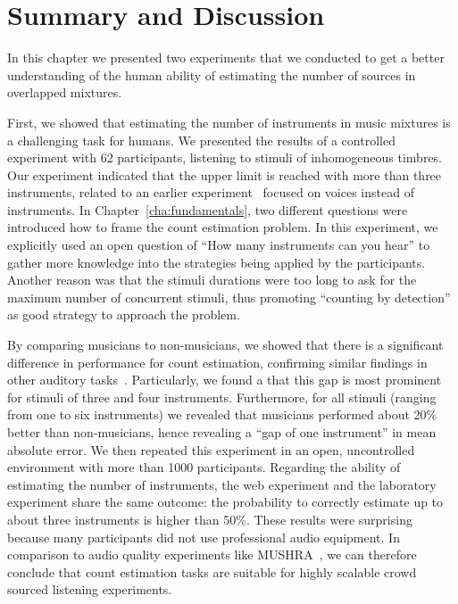 \section{Summary and Discussion}


In this chapter we presented two experiments that we conducted to get a better understanding of the human ability of estimating the number of sources in overlapped mixtures.
\par
First, we showed that estimating the number of instruments in music mixtures is a challenging task for humans.
We presented the results of a controlled experiment with 62 participants, listening to stimuli of inhomogeneous timbres.
Our experiment indicated that the upper limit is reached with more than three instruments, related to an earlier experiment~\cite{huron89} focused on voices instead of instruments.
In Chapter~\ref{cha:fundamentals}, two different questions were introduced how to frame the count estimation problem.
In this experiment, we explicitly used an open question of ``How many instruments can you hear'' to gather more knowledge into the strategies being applied by the participants.
Another reason was that the stimuli durations were too long to ask for the maximum number of concurrent stimuli, thus promoting ``counting by detection'' as good strategy to approach the problem.\par
By comparing musicians to non-musicians, we showed that there is a significant difference in performance for count estimation, confirming similar findings in other auditory tasks~\cite{kishon01}.
Particularly, we found a that this gap is most prominent for stimuli of three and four instruments.
Furthermore, for all stimuli (ranging from one to six instruments) we revealed that musicians performed about 20\% better than non-musicians, hence revealing a ``gap of one instrument'' in mean absolute error.
We then repeated this experiment in an open, uncontrolled environment with more than 1000 participants.
Regarding the ability of estimating the number of instruments, the web experiment and the laboratory experiment share the same outcome: the probability to correctly estimate up to about three instruments is higher than 50\%.
These results were surprising because many participants did not use professional audio equipment.
In comparison to audio quality experiments like MUSHRA~\cite{recommendation2001MUSHRA}, we can therefore conclude that count estimation tasks are suitable for highly scalable crowd sourced listening experiments.
